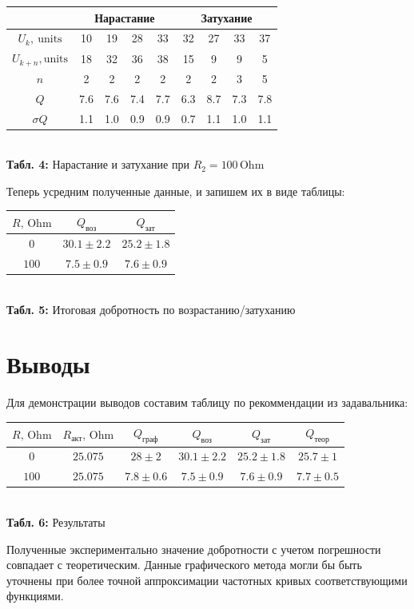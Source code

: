 \documentclass[12pt,a4paper]{scrartcl}
\begin{document}
	\begin{center}
		\begin{tabular}{|c|c|c|c|c|c|c|c|c|}  \hline
			{} & \multicolumn{4}{|c|}{Нарастание} & \multicolumn{4}{|c|}{Затухание} \\\hline
			$U_k,\ \text{units}$ & 10 & 19 & 28 & 33 & 32 & 27 & 33 & 37 \\\hline
			$U_{k+n}, \text{units}$ & 18 & 32 & 36 & 38 & 15 & 9 & 9 & 5 \\\hline
			$n$ & 2 & 2 & 2 & 2 & 2 & 2 & 3 & 5 \\\hline
			$Q$ & 7.6 & 7.6 & 7.4 & 7.7 & 6.3 & 8.7 & 7.3 & 7.8 \\\hline
			$\sigma Q$ & 1.1 & 1.0 & 0.9 & 0.9 & 0.7 & 1.1 & 1.0 & 1.1 \\\hline
		\end{tabular}
		\\\textbf{Табл. 4:} Нарастание и затухание при $R_2 = 100\, \mathrm{Ohm}$
	\end{center}

	Теперь усредним полученные данные, и запишем их в виде таблицы:
	
	\begin{center}
		\begin{tabular}{|c|c|c|} \hline
			$R,\, \mathrm{Ohm}$ & $Q_\text{воз}$ & $Q_\text{зат}$ \\\hline
			$0$ & $30.1 \pm 2.2$ & $25.2 \pm 1.8$ \\\hline
			$100$ & $7.5 \pm 0.9$ & $7.6 \pm 0.9$ \\\hline 
		\end{tabular}
		\\\textbf{Табл. 5:} Итоговая добротность по возрастанию/затуханию
	\end{center}
	
	\section{Выводы}
	
	Для демонстрации выводов составим таблицу по рекоммендации из задавальника:
	
	\begin{center}
		\begin{tabular}{|c|c|c|c|c|c|} \hline
			$R,\, \mathrm{Ohm}$ & $R_\text{акт},\, \mathrm{Ohm}$ & $Q_\text{граф}$ & $Q_\text{воз}$ & $Q_\text{зат}$ & $Q_\text{теор}$ \\\hline
			$0$ & $25.075$ & $28 \pm 2$ & $30.1 \pm 2.2$ & $25.2 \pm 1.8$ & $25.7 \pm 1$ \\\hline
			$100$ & $25.075$ & $7.8 \pm 0.6$ & $7.5 \pm 0.9$ & $7.6 \pm 0.9$ & $7.7 \pm 0.5$ \\\hline 
		\end{tabular}
		\\\textbf{Табл. 6:} Результаты
	\end{center}

	Полученные экспериментально значение добротности с учетом погрешности совпадает с теоретическим. Данные графического метода могли бы быть уточнены при более точной аппроксимации частотных кривых соответствующими функциями.
	
\end{document}
